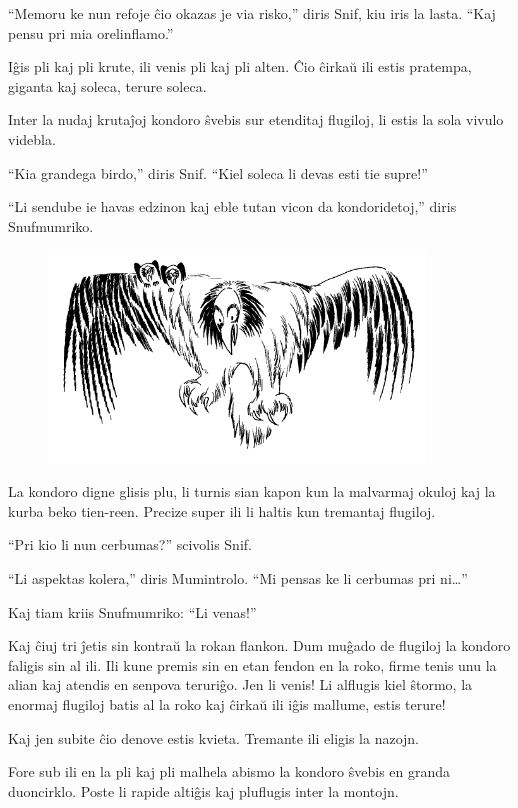 ``Memoru ke nun refoje ĉio okazas je via risko,'' diris Snif, kiu iris la lasta. ``Kaj pensu pri mia orelinflamo.''

Iĝis pli kaj pli krute, ili venis pli kaj pli alten. Ĉio ĉirkaŭ ili estis pratempa, giganta kaj soleca, terure soleca.

Inter la nudaj krutaĵoj kondoro ŝvebis sur etenditaj flugiloj, li estis la sola vivulo videbla.

``Kia grandega birdo,'' diris Snif. ``Kiel soleca li devas esti tie supre!''

``Li sendube ie havas edzinon kaj eble tutan vicon da kondoridetoj,'' diris Snufmumriko.

\begin{figure}[htbp]
\centering
\includegraphics[width=284pt,height=160pt]{4-2.png}
\caption{}
\label{4-2}
\end{figure}

La kondoro digne glisis plu, li turnis sian kapon kun la malvarmaj okuloj kaj la kurba beko tien-reen. Precize super ili li haltis kun tremantaj flugiloj.

``Pri kio li nun cerbumas?'' scivolis Snif.

``Li aspektas kolera,'' diris Mumintrolo. ``Mi pensas ke li cerbumas pri ni{\ldots}''

Kaj tiam kriis Snufmumriko: ``Li venas!''

Kaj ĉiuj tri ĵetis sin kontraŭ la rokan flankon. Dum muĝado de flugiloj la kondoro faligis sin al ili. Ili kune premis sin en etan fendon en la roko, firme tenis unu la alian kaj atendis en senpova teruriĝo. Jen li venis! Li alflugis kiel ŝtormo, la enormaj flugiloj batis al la roko kaj ĉirkaŭ ili iĝis mallume, estis terure!

Kaj jen subite ĉio denove estis kvieta. Tremante ili eligis la nazojn.

Fore sub ili en la pli kaj pli malhela abismo la kondoro ŝvebis en granda duoncirklo. Poste li rapide altiĝis kaj pluflugis inter la montojn.

